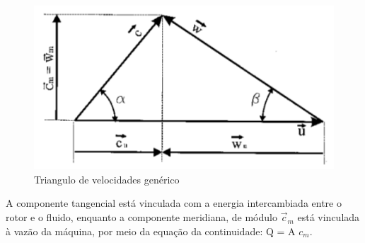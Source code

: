     \begin{figure}[htb]
        \centering
        \caption {\label {fig9:tri_vel} Triangulo de velocidades genérico }
        \includegraphics[scale=0.65]{images/fig9.png}
    \end{figure}

    A componente tangencial está vinculada com a energia intercambiada entre o rotor e o fluido, enquanto a componente meridiana, de módulo $\vec{c}_m$ está vinculada à vazão da máquina, por meio da equação da continuidade: Q = A $c_m$.

%
%
%
%

